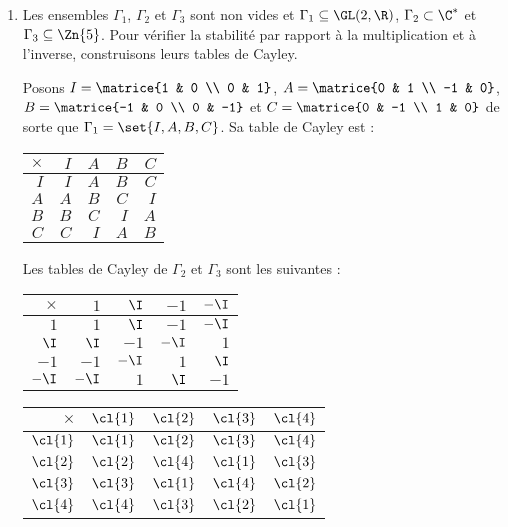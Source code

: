 \begin{enumerate}
  \item
    Les ensembles $\Gamma_1$, $\Gamma_2$ et $\Gamma_3$ sont non vides et $\Gamma_1\subseteq\GL(2,\R)$, $\Gamma_2\subset \C^*$ et $\Gamma_3\subseteq\Zn{5}$.
    Pour vérifier la stabilité par rapport à la multiplication et à l'inverse, construisons leurs tables de Cayley.

    Posons $I = \matrice{1 & 0 \\ 0 & 1}$, $A = \matrice{0 & 1 \\ -1 & 0}$, $B = \matrice{-1 & 0 \\ 0 & -1}$ et $C = \matrice{0 & -1 \\ 1 & 0}$ de sorte que $\Gamma_1 = \set{I, A, B, C}$.
    Sa table de Cayley est :
    \begin{center}
      \begin{tabular}{r|rrrr}
        $\times$ & $I$ & $A$ & $B$ & $C$ \\
        \midrule
             $I$ & $I$ & $A$ & $B$ & $C$ \\
             $A$ & $A$ & $B$ & $C$ & $I$ \\
             $B$ & $B$ & $C$ & $I$ & $A$ \\
             $C$ & $C$ & $I$ & $A$ & $B$ \\
      \end{tabular}
    \end{center}
  
  Les tables de Cayley de $\Gamma_2$ et $\Gamma_3$ sont les suivantes :

  \begin{minipage}{0.49\textwidth}
    \centering
    \begin{tabular}{r|rrrr}
      $\times$ & $1$   & $\I$  & $-1$  & $-\I$ \\
      \midrule
        $1$    & $1$   & $\I$  & $-1$  & $-\I$ \\
       $\I$    & $\I$  & $-1$  & $-\I$ & $1$   \\
       $-1$    & $-1$  & $-\I$ & $1$   & $\I$  \\
      $-\I$    & $-\I$ & $1$   & $\I$  & $-1$  \\
    \end{tabular}
  \end{minipage}
  \begin{minipage}{0.49\textwidth}
    \centering
    \begin{tabular}{r|rrrr}
      $\times$ & $\cl{1}$ & $\cl{2}$ & $\cl{3}$ & $\cl{4}$ \\
      \midrule
      $\cl{1}$ & $\cl{1}$ & $\cl{2}$ & $\cl{3}$ & $\cl{4}$ \\
      $\cl{2}$ & $\cl{2}$ & $\cl{4}$ & $\cl{1}$ & $\cl{3}$ \\
      $\cl{3}$ & $\cl{3}$ & $\cl{1}$ & $\cl{4}$ & $\cl{2}$ \\
      $\cl{4}$ & $\cl{4}$ & $\cl{3}$ & $\cl{2}$ & $\cl{1}$ \\
    \end{tabular}
  \end{minipage}


\end{enumerate}
